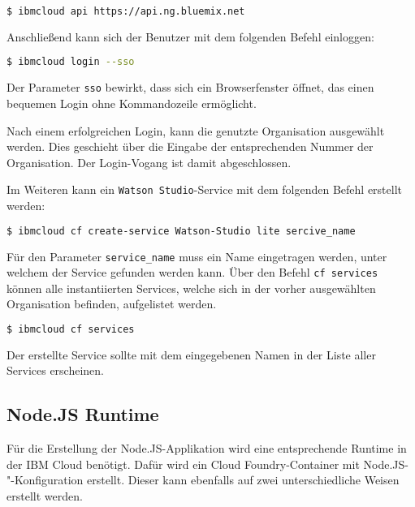 \begin{lstlisting}[language=bash, caption=Setzen des API Targets, label=Setzen des API Targets]
    $ ibmcloud api https://api.ng.bluemix.net
\end{lstlisting}

Anschließend kann sich der Benutzer mit dem folgenden Befehl einloggen:

\begin{lstlisting}[language=bash, caption=Login über CLI und Single Sign-on, label=Login über CLI und SSO]
    $ ibmcloud login --sso
\end{lstlisting}

Der Parameter \texttt{sso} bewirkt, dass sich ein Browserfenster öffnet, das einen bequemen Login ohne Kommandozeile
ermöglicht.

Nach einem erfolgreichen Login, kann die genutzte Organisation ausgewählt werden. Dies geschieht über die Eingabe der
entsprechenden Nummer der Organisation. Der Login-Vogang ist damit abgeschlossen.

Im Weiteren kann ein \texttt{Watson Studio}-Service mit dem folgenden Befehl erstellt werden:

\begin{lstlisting}[language=bash, caption=Instanziierung des Watson Studio Services, label=Instanziierung des Watson Studio Services]
    $ ibmcloud cf create-service Watson-Studio lite sercive_name
\end{lstlisting}

Für den Parameter \texttt{service\_name} muss ein Name eingetragen werden, unter welchem der Service gefunden werden kann.
Über den Befehl \texttt{cf services} können alle instantiierten Services, welche sich in der vorher ausgewählten
Organisation befinden, aufgelistet werden.

\begin{lstlisting}[language=bash, caption=Auflisten aller Services, label=Auflisten aller Services]
    $ ibmcloud cf services
\end{lstlisting}

Der erstellte Service sollte mit dem eingegebenen Namen in der Liste aller Services erscheinen.

\subsection{Node.JS Runtime}
\label{ssc:nodejs_runtime}
Für die Erstellung der Node.JS-Applikation wird eine entsprechende Runtime in der IBM Cloud benötigt. Dafür wird ein
Cloud Foundry-Container mit Node.JS-"-Konfiguration erstellt. Dieser kann ebenfalls auf zwei unterschiedliche Weisen erstellt
werden.

